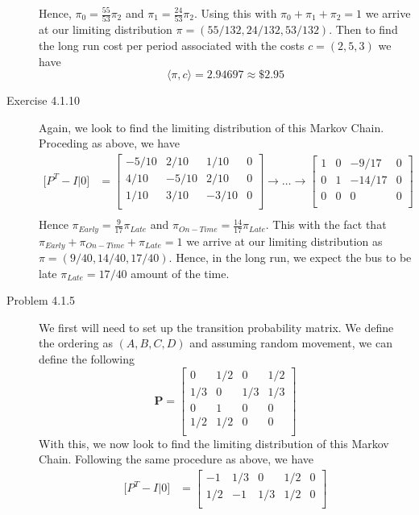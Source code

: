 \documentclass[12pt]{article}  %
\begin{document}
\begin{description}
Hence, $\pi_0 = \frac{55}{53}\pi_2$ and $\pi_1 = \frac{24}{53}\pi_2$. Using this with $\pi_0 + \pi_1 + \pi_2 = 1$ we arrive at our limiting distribution $\pi = (55/132, 24/132, 53/132)$. Then to find the long run cost per period associated with the costs $c = (2,5,3)$ we have $$\langle \pi, c\rangle = 2.94697 \approx \$ 2.95$$ 
\item[Exercise 4.1.10]
Again, we look to find the limiting distribution of this Markov Chain. Proceding as above, we have 
\begin{align*}
\Big[P^T - I\Big\vert 0\Big] &= 
\begin{bmatrix}
-5/10 & 2/10 & 1/10 & 0\\
4/10 & -5/10 & 2/10 & 0\\
1/10 & 3/10 & -3/10 & 0\\
\end{bmatrix}
\rightarrow\dots\rightarrow
\begin{bmatrix}
1 & 0 & -9/17 & 0\\
0 & 1 & -14/17 & 0\\
0 & 0 & 0 & 0\\
\end{bmatrix}\\
\end{align*}
Hence $\pi_{Early}= \frac{9}{17}\pi_{Late}$ and $\pi_{On-Time}= \frac{14}{17}\pi_{Late}$. This with the fact that $\pi_{Early} + \pi_{On-Time} + \pi_{Late} = 1$ we arrive at our limiting distribution as $\pi = (9/40, 14/40, 17/40)$. Hence, in the long run, we expect the bus to be late $\pi_{Late} = 17/40$ amount of the time. 
\item[Problem 4.1.5] We first will need to set up the transition probability matrix. We define the ordering as $(A,B,C,D)$ and assuming random movement, we can define the following  
\[ \mathbf{P} = 
\begin{bmatrix}
0 & 1/2 & 0 & 1/2\\
1/3 & 0 & 1/3 & 1/3\\
0 & 1 & 0 & 0\\
1/2 & 1/2 & 0 & 0\\
\end{bmatrix}
\]
With this, we now look to find the limiting distribution of this Markov Chain. Following the same procedure as above, we have 
\begin{align*}
\Big[P^T - I\Big\vert 0\Big] &= 
\begin{bmatrix}
-1 & 1/3 & 0 & 1/2 & 0 \\
1/2 & -1 & 1/3 & 1/2 &0\\

\end{bmatrix}
\end{align*}
\end{description}
\end{document}
